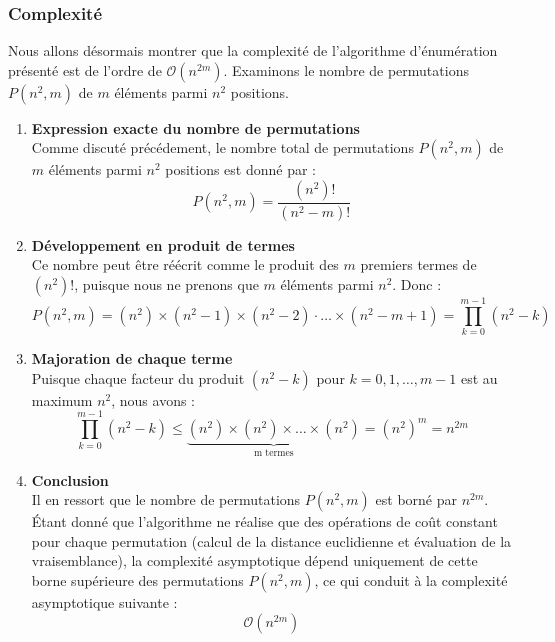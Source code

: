 \documentclass{article}
\begin{document}
\subsubsection{Complexité}\label{subsec:complex}

\noindent Nous allons désormais montrer que la complexité de l'algorithme d'énumération présenté est de l'ordre de \( \mathcal{O}(n^{2m}) \). Examinons le nombre de permutations \( P(n^2, m) \) de \( m \) éléments parmi \( n^2 \) positions.

\vspace{1em}

\begin{enumerate}[left=0pt]

\item \textbf{Expression exacte du nombre de permutations} \\
Comme discuté précédement, le nombre total de permutations \( P(n^2, m) \) de \( m \) éléments parmi \( n^2 \) positions est donné par :
\[
P(n^2, m) = \frac{(n^2)!}{(n^2 - m)!}
\]

\item \textbf{Développement en produit de termes} \\
Ce nombre peut être réécrit comme le produit des \( m \) premiers termes de \( (n^2)! \), puisque nous ne prenons que \( m \) éléments parmi \( n^2 \). Donc :
\[
P(n^2, m) = (n^2) \times (n^2 - 1) \times (n^2 - 2) \cdot \dots \times (n^2 - m + 1) = \prod_{k=0}^{m-1} (n^2 - k)
\]

\item \textbf{Majoration de chaque terme} \\
Puisque chaque facteur du produit \( (n^2 - k) \) pour \( k = 0, 1, \dots, m-1 \) est au maximum \( n^2 \), nous avons :
\[
\prod_{k=0}^{m-1} (n^2 - k) \leq \underset{\text{m termes}}{\underbrace{(n^2) \times (n^2) \times \dots \times (n^2)}}
= (n^2)^m = n^{2m}
\]

\item \textbf{Conclusion} \\
Il en ressort que le nombre de permutations \( P(n^2, m) \) est borné par \( n^{2m} \). Étant donné que l'algorithme ne réalise que des opérations de coût constant pour chaque permutation (calcul de la distance euclidienne et évaluation de la vraisemblance), la complexité asymptotique dépend uniquement de cette borne supérieure des permutations \( P(n^2, m) \), ce qui conduit à la complexité asymptotique suivante :
\[
\mathcal{O}(n^{2m})
\]

\end{enumerate}
\end{document}
